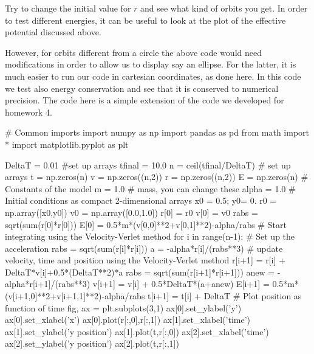 \documentclass[%
oneside,                 %
final,                   %
10pt]{article}
\begin{document}
Try to change the initial value for $r$ and see what kind of orbits you get.
In order to test different energies, it can be useful to look at the plot of the effective potential discussed above.

However, for orbits different from a circle the above code would need modifications in order to allow us to display say an ellipse. For the latter, it is much easier to run our code in cartesian coordinates, as done here. In this code we test also energy conservation and see that it is conserved to numerical precision. The code here is a simple extension of the code we developed for homework 4.

























































\bpycod
# Common imports
import numpy as np
import pandas as pd
from math import *
import matplotlib.pyplot as plt

DeltaT = 0.01
#set up arrays 
tfinal = 10.0
n = ceil(tfinal/DeltaT)
# set up arrays
t = np.zeros(n)
v = np.zeros((n,2))
r = np.zeros((n,2))
E = np.zeros(n)
# Constants of the model
m = 1.0   # mass, you can change these
alpha = 1.0
# Initial conditions as compact 2-dimensional arrays
x0 = 0.5; y0= 0.
r0 = np.array([x0,y0]) 
v0 = np.array([0.0,1.0])
r[0] = r0
v[0] = v0
rabs = sqrt(sum(r[0]*r[0]))
E[0] = 0.5*m*(v[0,0]**2+v[0,1]**2)-alpha/rabs
# Start integrating using the Velocity-Verlet  method
for i in range(n-1):
    # Set up the acceleration
    rabs = sqrt(sum(r[i]*r[i]))
    a =  -alpha*r[i]/(rabs**3)
    # update velocity, time and position using the Velocity-Verlet method
    r[i+1] = r[i] + DeltaT*v[i]+0.5*(DeltaT**2)*a
    rabs = sqrt(sum(r[i+1]*r[i+1]))
    anew = -alpha*r[i+1]/(rabs**3)
    v[i+1] = v[i] + 0.5*DeltaT*(a+anew)
    E[i+1] = 0.5*m*(v[i+1,0]**2+v[i+1,1]**2)-alpha/rabs
    t[i+1] = t[i] + DeltaT
# Plot position as function of time
fig, ax = plt.subplots(3,1)
ax[0].set_ylabel('y')
ax[0].set_xlabel('x')
ax[0].plot(r[:,0],r[:,1])
ax[1].set_xlabel('time')
ax[1].set_ylabel('y position')
ax[1].plot(t,r[:,0])
ax[2].set_xlabel('time')
ax[2].set_ylabel('y position')
ax[2].plot(t,r[:,1])
\end{document}
